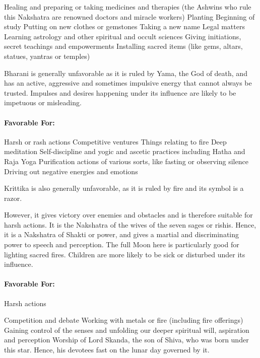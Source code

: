 Healing and preparing or taking medicines and therapies (the Ashwins who rule this Nakshatra are renowned doctors and miracle workers)
Planting
Beginning of study
Putting on new clothes or gemstones
Taking a new name
Legal matters
Learning astrology and other spiritual and occult sciences
Giving initiations, secret teachings and empowerments
Installing sacred items (like gems, altars, statues, yantras or temples)
 


Bharani is generally unfavorable as it is ruled by Yama, the God of death, and has an active, aggressive and sometimes impulsive energy that cannot always be trusted. Impulses and desires happening under its influence are likely to be impetuous or misleading.

 

\paragraph{Favorable For:}

Harsh or rash actions
Competitive ventures
Things relating to fire
Deep meditation
Self-discipline and yogic and ascetic practices including Hatha and Raja Yoga
Purification actions of various sorts, like fasting or observing silence
Driving out negative energies and emotions
 


Krittika is also generally unfavorable, as it is ruled by fire and its symbol is a razor.

However, it gives victory over enemies and obstacles and is therefore suitable for harsh actions. It is the Nakshatra of the wives of the seven sages or rishis. Hence, it is a Nakshatra of Shakti or power, and gives a martial and discriminating power to speech and perception. The full Moon here is particularly good for lighting sacred fires. Children are more likely to be sick or disturbed under its influence.

 

\paragraph{Favorable For:}

Harsh actions

Competition and debate
Working with metals or fire (including fire offerings)
Gaining control of the senses and unfolding our deeper spiritual will, aspiration and perception
Worship of Lord Skanda, the son of Shiva, who was born under this star. Hence, his devotees fast on the lunar day governed by it.
 

